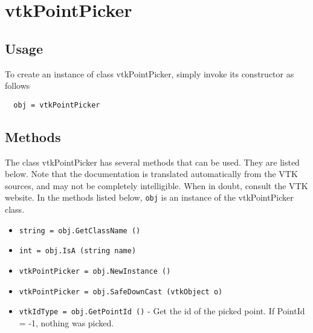 \section{vtkPointPicker}

\subsection{Usage}


To create an instance of class vtkPointPicker, simply
invoke its constructor as follows
\begin{verbatim}
  obj = vtkPointPicker
\end{verbatim}
\subsection{Methods}

The class vtkPointPicker has several methods that can be used.
  They are listed below.
Note that the documentation is translated automatically from the VTK sources,
and may not be completely intelligible.  When in doubt, consult the VTK website.
In the methods listed below, \verb|obj| is an instance of the vtkPointPicker class.
\begin{itemize}
\item  \verb|string = obj.GetClassName ()|

\item  \verb|int = obj.IsA (string name)|

\item  \verb|vtkPointPicker = obj.NewInstance ()|

\item  \verb|vtkPointPicker = obj.SafeDownCast (vtkObject o)|

\item  \verb|vtkIdType = obj.GetPointId ()| -  Get the id of the picked point. If PointId = -1, nothing was picked.

\end{itemize}
